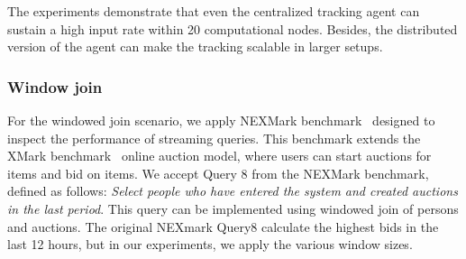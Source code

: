 The experiments demonstrate that even the centralized tracking agent can sustain a high input rate within 20 computational nodes. Besides, the distributed version of the agent can make the tracking scalable in larger setups.

\subsubsection{Window join}
For the windowed join scenario, we apply NEXMark benchmark~\cite{tucker2008nexmark} designed to inspect the performance of streaming queries. This benchmark extends the XMark benchmark~\cite{schmidt2002xmark} online auction model, where users can start auctions for items and bid on items. We accept Query 8 from the NEXMark benchmark, defined as follows: {\em Select people who have entered the system and created auctions in the last period}. This query can be implemented using windowed join of persons and auctions. The original NEXmark Query8 calculate the highest bids in the last 12 hours, but in our experiments, we apply the various window sizes.

